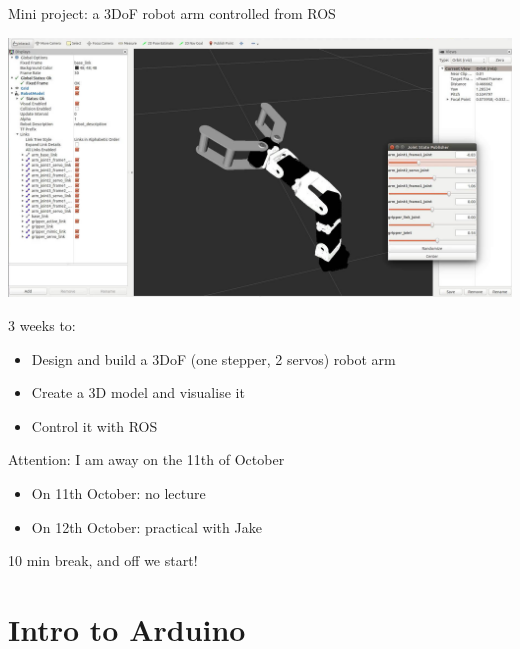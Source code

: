 \documentclass[compress]{beamer}
\begin{document}
\begin{frame}{Mini project: a 3DoF robot arm controlled from ROS}
    \begin{center}
        \includegraphics[width=0.8\linewidth]{arm-rviz}
    \end{center}

    3 weeks to:

    \begin{itemize}
        \item Design and build a 3DoF (one stepper, 2 servos) robot arm
        \item Create a 3D model and visualise it
        \item Control it with ROS
    \end{itemize}

\end{frame}

\begin{frame}{Attention: I am away on the 11th of October}
    \begin{itemize}
        \item On 11th October: no lecture
        \item On 12th October: practical with Jake
    \end{itemize}
\end{frame}


\begin{frame}[plain]
    \begin{center}
        \Large
        10 min break, and off we start!\\[2em]
    \end{center}
\end{frame}

\section{Intro to Arduino}
\end{document}
